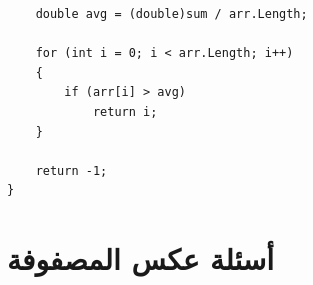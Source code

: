 \documentclass[14pt]{extarticle}
\begin{document}
\begin{enumerate}[resume, itemsep=2em]
\begin{boxSolution}
\begin{english}
\begin{verbatim}
    double avg = (double)sum / arr.Length;

    for (int i = 0; i < arr.Length; i++)
    {
        if (arr[i] > avg)
            return i;
    }

    return -1;
}
    \end{verbatim}
    \end{english}
    \end{boxSolution}
    \fi

\end{enumerate}

\clearpage

\section{أسئلة عكس المصفوفة}
\end{document}
